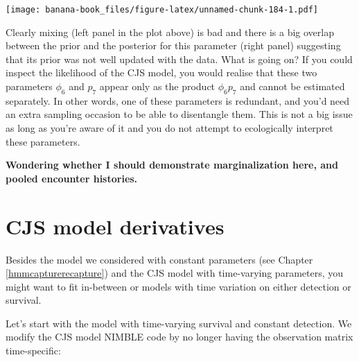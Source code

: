 \documentclass[
  12pt,
]{krantz}
\begin{document}
\texttt{[image: banana-book\_files/figure-latex/unnamed-chunk-184-1.pdf]}

Clearly mixing (left panel in the plot above) is bad and there is a big overlap between the prior and the posterior for this parameter (right panel) suggesting that its prior was not well updated with the data. What is going on? If you could inspect the likelihood of the CJS model, you would realise that these two parameters \(\phi_6\) and \(p_7\) appear only as the product \(\phi_6 p_7\) and cannot be estimated separately. In other words, one of these parameters is redundant, and you'd need an extra sampling occasion to be able to disentangle them. This is not a big issue as long as you're aware of it and you do not attempt to ecologically interpret these parameters.

\textbf{Wondering whether I should demonstrate marginalization here, and pooled encounter histories.}

\hypertarget{cjs-model-derivatives}{%
\section{CJS model derivatives}\label{cjs-model-derivatives}}

Besides the model we considered with constant parameters (see Chapter \ref{hmmcapturerecapture}) and the CJS model with time-varying parameters, you might want to fit in-between or models with time variation on either detection or survival.

Let's start with the model with time-varying survival and constant detection. We modify the CJS model NIMBLE code by no longer having the observation matrix time-specific:
\end{document}
